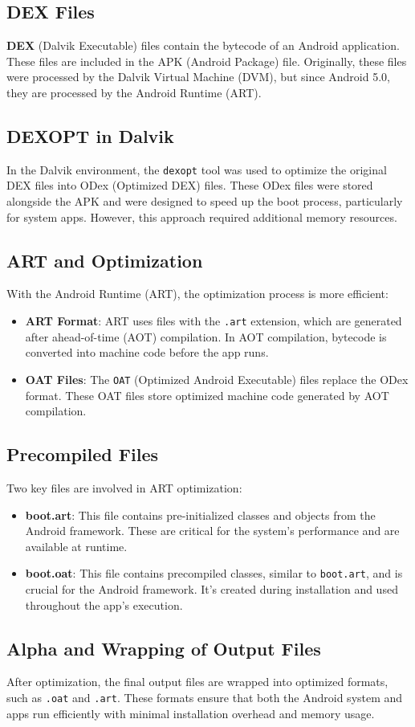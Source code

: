 \documentclass{article}
\begin{document}
\subsection{DEX Files}
\textbf{DEX} (Dalvik Executable) files contain the bytecode of an Android application. These files are included in the APK (Android Package) file. Originally, these files were processed by the Dalvik Virtual Machine (DVM), but since Android 5.0, they are processed by the Android Runtime (ART).

\subsection{DEXOPT in Dalvik}
In the Dalvik environment, the \texttt{dexopt} tool was used to optimize the original DEX files into ODex (Optimized DEX) files. These ODex files were stored alongside the APK and were designed to speed up the boot process, particularly for system apps. However, this approach required additional memory resources.

\subsection{ART and Optimization}
With the Android Runtime (ART), the optimization process is more efficient:
\begin{itemize}
    \item \textbf{ART Format}: ART uses files with the \texttt{.art} extension, which are generated after ahead-of-time (AOT) compilation. In AOT compilation, bytecode is converted into machine code before the app runs.
    \item \textbf{OAT Files}: The \texttt{OAT} (Optimized Android Executable) files replace the ODex format. These OAT files store optimized machine code generated by AOT compilation.
\end{itemize}

\subsection{Precompiled Files}
Two key files are involved in ART optimization:
\begin{itemize}
    \item \textbf{boot.art}: This file contains pre-initialized classes and objects from the Android framework. These are critical for the system’s performance and are available at runtime.
    \item \textbf{boot.oat}: This file contains precompiled classes, similar to \texttt{boot.art}, and is crucial for the Android framework. It’s created during installation and used throughout the app’s execution.
\end{itemize}

\subsection{Alpha and Wrapping of Output Files}
After optimization, the final output files are wrapped into optimized formats, such as \texttt{.oat} and \texttt{.art}. These formats ensure that both the Android system and apps run efficiently with minimal installation overhead and memory usage.
\end{document}
